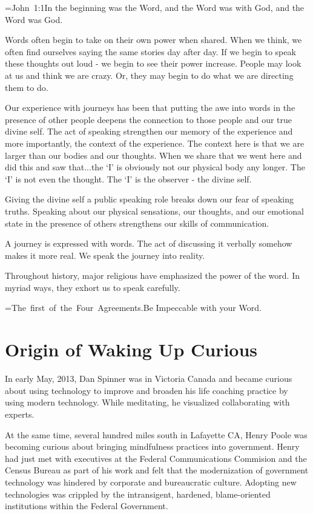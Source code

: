 \documentclass[12pt]{book}
\def\quoteattr#1#2{\setbox0=\hbox{#2}#1\tabto{\dimexpr\linewidth-\wd0}\box0}
\begin{document}
\quoteattr{In the beginning was the Word, and the Word was with God, and the Word was God.}{John 1:1}

Words often begin to take on their own power when shared. When we think, we often find ourselves saying the same stories day after day. If we begin to speak these thoughts out loud - we begin to see their power increase. People may look at us and think we are crazy. Or, they may begin to do what we are directing them to do.

Our experience with journeys has been that putting the awe into words in the presence of other people deepens the connection to those people and our true divine self. The act of speaking strengthen our memory of the experience and more importantly, the context of the experience. The context here is that we are larger than our bodies and our thoughts. When we share that we went here and did this and saw that...the ‘I’ is obviously not our physical body any longer. The ‘I’ is not even the thought. The ‘I’ is the observer - the divine self.

Giving the divine self a public speaking role breaks down our fear of speaking truths. Speaking about our physical sensations, our thoughts, and our emotional state in the presence of others strengthens our skills of communication.

A journey is expressed with words. The act of discussing it verbally somehow makes it more real. We speak the journey into reality.
					
Throughout history, major religious have emphasized the power of the word. In myriad ways, they exhort us to speak carefully.

\quoteattr{Be Impeccable with your Word.}{The first of the Four Agreements.\cite{ruiz2010four}}


\chapter{Origin of Waking Up Curious}

In early May, 2013, Dan Spinner was in Victoria Canada and became curious about using technology to improve and broaden his life coaching practice by using modern technology. While meditating, he visualized collaborating with experts.
					
At the same time, several hundred miles south in Lafayette CA, Henry Poole was becoming curious about bringing mindfulness practices into government.
Henry had just met with executives at the Federal Communications Commision and the Census Bureau as part of his work and felt that the modernization of government technology was hindered by corporate and bureaucratic culture.
Adopting new technologies was crippled by the intransigent, hardened, blame-oriented institutions within the Federal Government.
					
\end{document}

